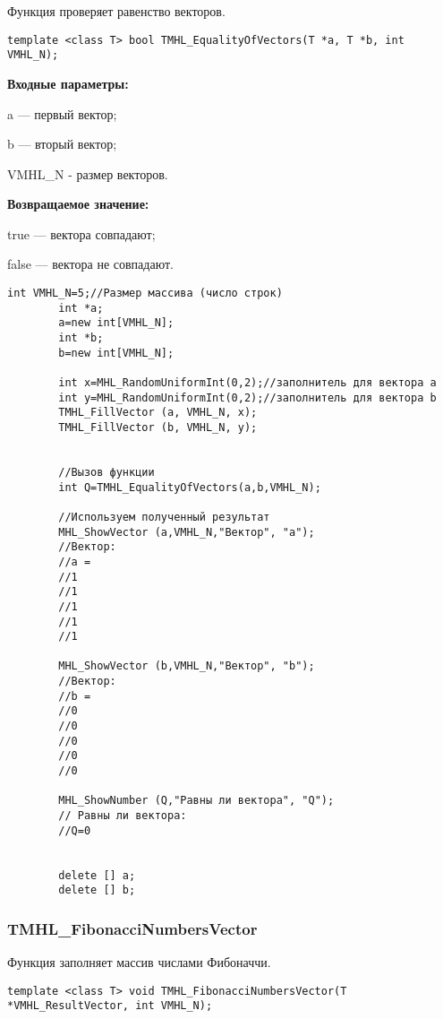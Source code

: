 \documentclass[a4paper,12pt]{article}
\begin{document}
Функция проверяет равенство векторов.


\begin{lstlisting}[label=code_syntax_TMHL_EqualityOfVectors,caption=Синтаксис]
template <class T> bool TMHL_EqualityOfVectors(T *a, T *b, int VMHL_N);
\end{lstlisting}

\textbf{Входные параметры:}

  a --- первый вектор;
  
 b --- вторый вектор;
 
 VMHL\_N - размер векторов.

\textbf{Возвращаемое значение:}

 true --- вектора совпадают;
 
 false --- вектора не совпадают.


\begin{lstlisting}[label=code_use_TMHL_EqualityOfVectors,caption=Пример использования]
        int VMHL_N=5;//Размер массива (число строк)
        int *a;
        a=new int[VMHL_N];
        int *b;
        b=new int[VMHL_N];

        int x=MHL_RandomUniformInt(0,2);//заполнитель для вектора a
        int y=MHL_RandomUniformInt(0,2);//заполнитель для вектора b
        TMHL_FillVector (a, VMHL_N, x);
        TMHL_FillVector (b, VMHL_N, y);


        //Вызов функции
        int Q=TMHL_EqualityOfVectors(a,b,VMHL_N);

        //Используем полученный результат
        MHL_ShowVector (a,VMHL_N,"Вектор", "a");
        //Вектор:
        //a =
        //1
        //1
        //1
        //1
        //1

        MHL_ShowVector (b,VMHL_N,"Вектор", "b");
        //Вектор:
        //b =
        //0
        //0
        //0
        //0
        //0

        MHL_ShowNumber (Q,"Равны ли вектора", "Q");
        // Равны ли вектора:
        //Q=0


        delete [] a;
        delete [] b;
\end{lstlisting}

\subsubsection{TMHL\_FibonacciNumbersVector}\label{TMHL_FibonacciNumbersVector}

Функция заполняет массив числами Фибоначчи.


\begin{lstlisting}[label=code_syntax_TMHL_FibonacciNumbersVector,caption=Синтаксис]
template <class T> void TMHL_FibonacciNumbersVector(T *VMHL_ResultVector, int VMHL_N);
\end{lstlisting}
\end{document}
